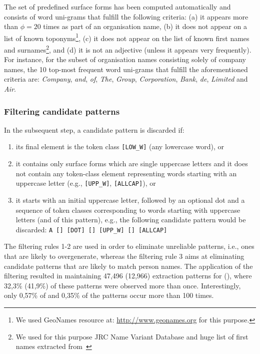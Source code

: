 \documentclass[output=paper]{langsci/langscibook}
\begin{document}
The set of predefined surface forms has been computed automatically and consists of word uni-grams that fulfill the following criteria: (a) it appears more than $\phi=20$ times as part of an organisation name, (b) it does not appear on a list of known toponyms\footnote{We used GeoNames resource at: \url{http://www.geonames.org} for this purpose.}, (c) it does not appear on the list of known first names and surnames\footnote{We used for this purpose {\sc JRC Name Variant Database} and huge list of first names extracted from~\cite{piskorski-11}}, and (d) it is not an adjective (unless it appears very frequently). For instance, for the subset of  organisation names consisting solely of company names, the 10 top-most frequent word uni-grams that fulfill the aforementioned criteria are: \textit{Company}, \textit{and}, \textit{of}, \textit{The}, \textit{Group}, \textit{Corporation}, \textit{Bank}, \textit{de}, \textit{Limited} and \textit{Air}.  

\subsubsection{Filtering candidate patterns} In the subsequent
step, a candidate pattern is discarded if:
\begin{enumerate}
\item its final element is the token class \verb+[LOW_W]+ (any
  lowercase word), or
\item it contains only surface forms which are single uppercase
  letters and it does not contain any token-class element representing
  words starting with an uppercase letter (e.g., \verb+[UPP_W]+,
  \verb+[ALLCAP]+), or
\item it starts with an initial uppercase letter, followed by an
  optional dot and a sequence of token classes corresponding to words
  starting with uppercase letters (and  of this pattern),
  e.g., the following candidate pattern would be discarded:
  \verb+A [] [DOT] [] [UPP_W] [] [ALLCAP]+
\end{enumerate} 

The filtering rules 1-2 are used in order to eliminate
unreliable patterns, i.e., ones that are likely to overgenerate,
whereas the filtering rule 3 aims at eliminating candidate patterns
that are likely to match person names.  The application of the
filtering resulted in maintaining 47,496 (12,966) extraction patterns
for  (), where 32,3\% (41,9\%) of these patterns were
observed more than once. Interestingly, only 0,57\% of  and
0,35\% of the  patterns occur more than 
100 times.
\end{document}
